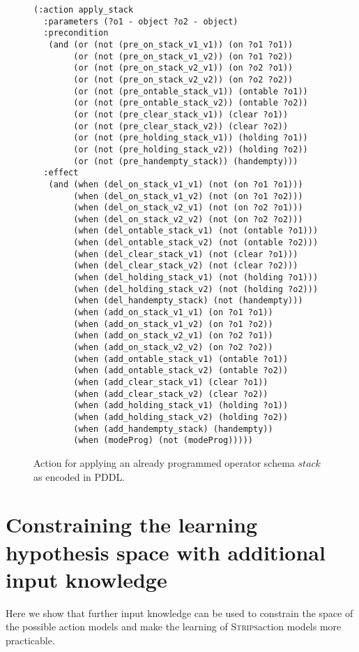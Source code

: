 \documentclass[letterpaper]{article} %
\newcommand{\strips}{\textsc{Strips}}     %
\begin{document}
\begin{figure}[hbt]
\begin{scriptsize}
\begin{verbatim}
(:action apply_stack
  :parameters (?o1 - object ?o2 - object)
  :precondition
   (and (or (not (pre_on_stack_v1_v1)) (on ?o1 ?o1))
        (or (not (pre_on_stack_v1_v2)) (on ?o1 ?o2))
        (or (not (pre_on_stack_v2_v1)) (on ?o2 ?o1))
        (or (not (pre_on_stack_v2_v2)) (on ?o2 ?o2))
        (or (not (pre_ontable_stack_v1)) (ontable ?o1))
        (or (not (pre_ontable_stack_v2)) (ontable ?o2))
        (or (not (pre_clear_stack_v1)) (clear ?o1))
        (or (not (pre_clear_stack_v2)) (clear ?o2))
        (or (not (pre_holding_stack_v1)) (holding ?o1))
        (or (not (pre_holding_stack_v2)) (holding ?o2))
        (or (not (pre_handempty_stack)) (handempty)))
  :effect
   (and (when (del_on_stack_v1_v1) (not (on ?o1 ?o1)))
        (when (del_on_stack_v1_v2) (not (on ?o1 ?o2)))
        (when (del_on_stack_v2_v1) (not (on ?o2 ?o1)))
        (when (del_on_stack_v2_v2) (not (on ?o2 ?o2)))
        (when (del_ontable_stack_v1) (not (ontable ?o1)))
        (when (del_ontable_stack_v2) (not (ontable ?o2)))
        (when (del_clear_stack_v1) (not (clear ?o1)))
        (when (del_clear_stack_v2) (not (clear ?o2)))
        (when (del_holding_stack_v1) (not (holding ?o1)))
        (when (del_holding_stack_v2) (not (holding ?o2)))
        (when (del_handempty_stack) (not (handempty)))
        (when (add_on_stack_v1_v1) (on ?o1 ?o1))
        (when (add_on_stack_v1_v2) (on ?o1 ?o2))
        (when (add_on_stack_v2_v1) (on ?o2 ?o1))
        (when (add_on_stack_v2_v2) (on ?o2 ?o2))
        (when (add_ontable_stack_v1) (ontable ?o1))
        (when (add_ontable_stack_v2) (ontable ?o2))
        (when (add_clear_stack_v1) (clear ?o1))
        (when (add_clear_stack_v2) (clear ?o2))
        (when (add_holding_stack_v1) (holding ?o1))
        (when (add_holding_stack_v2) (holding ?o2))
        (when (add_handempty_stack) (handempty))
        (when (modeProg) (not (modeProg)))))
\end{verbatim}
\end{scriptsize}
 \caption{\small Action for applying an already programmed operator schema $stack$ as encoded in PDDL.}
\label{fig:compilation}
\end{figure}


\section{Constraining the learning hypothesis space with additional input knowledge}
Here we show that further input knowledge can be used to constrain the space of the possible action models and make the learning of \strips action models more practicable.
\end{document}
